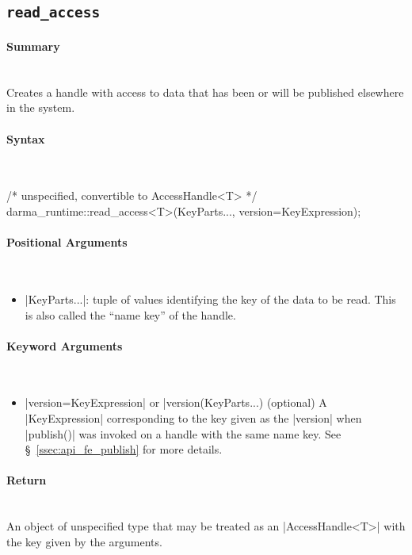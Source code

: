 \subsection{\texttt{read\_access}}
\label{ssec:api_fe_read_access}

\paragraph{Summary}\mbox{}\\
Creates a handle with  access to data that has been or will be
published elsewhere in the system.

\paragraph{Syntax}\mbox{}\\
\begin{CppCode}
/* unspecified, convertible to AccessHandle<T> */
darma_runtime::read_access<T>(KeyParts..., version=KeyExpression);
\end{CppCode}

\paragraph{Positional Arguments}\mbox{}\\
\begin{itemize}
  \item |KeyParts...|: tuple of values identifying the key of the data to
  be read.  This is also called the ``name key'' of the handle.
\end{itemize}

\paragraph{Keyword Arguments}\mbox{}\\
\begin{itemize}
  \item |version=KeyExpression| or |version(KeyParts...) (optional) A
  |KeyExpression| corresponding to the key given as the |version| when
  |publish()| was invoked on a handle with the same name key.  See
  \S~\ref{ssec:api_fe_publish} for more details.
\end{itemize}


\paragraph{Return}\mbox{}\\
An object of unspecified type that may be treated as an |AccessHandle<T>|
with the key given by the arguments.

